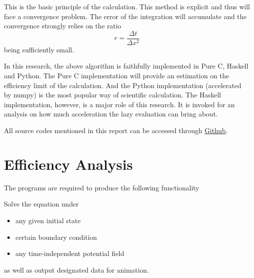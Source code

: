 \documentclass[11pt]{article}
\begin{document}
This is the basic principle of the calculation. This method is explicit and thus will face a convergence problem. The error of the integration will accumulate and the convergence strongly relies on the ratio
\begin{equation}
	r = \frac{\Delta t}{\Delta x^2}
\end{equation}
being sufficiently small.

In this research, the above algorithm is faithfully implemented in Pure C, Haskell and Python. The Pure C implementation will provide an estimation on the efficiency limit of the calculation. And the Python implementation (accelerated by numpy) is the most popular way of scientific calculation. The Haskell implementation, however, is a major role of this research. It is invoked for an analysis on how much acceleration the lazy evaluation can bring about. 

All source codes mentioned in this report can be accessed through \href{https://github.com/Phy-David-Zhang/Scientific-Haskell}{Github}. 

\section{Efficiency Analysis}

The programs are required to produce the following functionality

Solve the equation under
\vspace{-5pt}
\begin{itemize}
	\setlength\itemsep{-3pt}
	\item any given initial state
	\item certain boundary condition
	\item any time-independent potential field
\end{itemize}
\vspace{-5pt}
as well as output designated data for animation.

\vspace{5pt}
\end{document}
